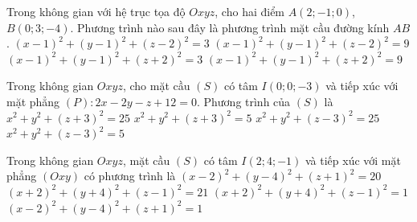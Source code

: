 \begin{ex}%
	Trong không gian với hệ trục tọa độ $Oxyz$, cho hai điểm $A\left(2;-1;0\right)$, $B\left(0;3;-4\right)$. Phương trình nào sau đây là phương trình mặt cầu đường kính $ AB  $.
	\choice 
		{$\left(x-1\right)^2+\left(y-1\right)^2+\left(z-2\right)^2=3$} 
		 {$\left(x-1\right)^2+\left(y-1\right)^2+\left(z-2\right)^2=9$}
		 {$\left(x-1\right)^2+\left(y-1\right)^2+\left(z+2\right)^2=3$}
		{\True  $\left(x-1\right)^2+\left(y-1\right)^2+\left(z+2\right)^2=9$}
\end{ex}

\begin{ex}%
	Trong không gian $Oxyz$, cho mặt cầu $(S)$ có tâm $I\left(0;0;-3\right)$ và tiếp xúc với mặt phẳng $(P)\colon 2x-2y-z+12=0$. Phương trình của $(S)$  là
	 \choice
		{\True  $x^2+y^2+\left(z+3\right)^2=25$}
		 {$x^2+y^2+\left(z+3\right)^2=5$}
		{$x^2+y^2+\left(z-3\right)^2=25$} 
		{$x^2+y^2+\left(z-3\right)^2=5$} 
\end{ex}

\begin{ex}%
	Trong không gian $Oxyz$, mặt  cầu $(S)$ có tâm $I(2;4;-1)$ và tiếp xúc với mặt phẳng $(Oxy)$ có phương trình là
	 \choice
		{$(x-2)^2+(y-4)^2+(z+1)^2=20 $} 
		{$(x+2)^2+(y+4)^2+(z-1)^2=21$} 
		 {$(x+2)^2+(y+4)^2+(z-1)^2=1$}
		 {\True $(x-2)^2+(y-4)^2+(z+1)^2=1$}
\end{ex}

